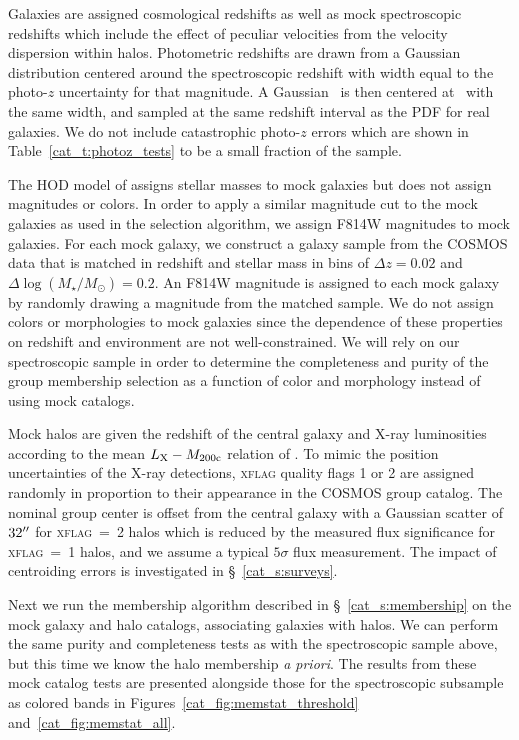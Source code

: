 Galaxies are assigned cosmological redshifts as well as mock
spectroscopic redshifts which include the effect of peculiar
velocities from the velocity dispersion within halos. Photometric
redshifts are drawn from a Gaussian distribution centered around the
spectroscopic redshift with width equal to the photo-$z$ uncertainty for
that magnitude. A Gaussian \pz\ is then centered at \zp\ with the same
width, and sampled at the same redshift interval as the PDF for real
galaxies. We do not include catastrophic photo-$z$ errors which are
shown in Table~\ref{cat_t:photoz_tests} to be a small fraction of the sample. 

The HOD model of \citet{Leauthaud2011a} assigns stellar
masses to mock galaxies but does not assign magnitudes or colors. In
order to apply a similar magnitude cut to the mock galaxies as used in
the selection algorithm, we assign F814W magnitudes to mock
galaxies. For each mock galaxy, we construct a galaxy sample from the
COSMOS data that is matched in redshift and stellar mass in bins of
$\Delta z=0.02$ and $\Delta\log(M_{\star}/M_{\odot})=0.2$. An F814W magnitude
is assigned to each mock galaxy by randomly drawing a magnitude from
the matched sample. We do not assign colors or morphologies to mock
galaxies since the dependence of these properties on redshift and
environment are not well-constrained. We will rely on our
spectroscopic sample in order to determine the completeness and purity
of the group membership selection as a function of color and
morphology instead of using mock catalogs.

Mock halos are given the redshift of the central galaxy and X-ray
luminosities according to the mean $L_{\rm X}-\mbox{$M_{200\rm{c}}$}$ relation of
\citet{Leauthaud2010}. To mimic the position uncertainties of the
X-ray detections, \textsc{xflag} quality flags 1 or 2 are assigned randomly
in proportion to their appearance in the COSMOS group catalog. The nominal
group center is offset from the central galaxy with a Gaussian scatter of $32
\mbox{$^{\prime\prime}$}$ for \textsc{xflag}~=~2 halos which is reduced by the measured flux
significance for \textsc{xflag}~=~1 halos, and we assume a typical
$5\sigma$ flux measurement. The impact of centroiding errors is investigated in
\S~\ref{cat_s:surveys}.

Next we run the membership algorithm described in
\S~\ref{cat_s:membership} on the mock galaxy and halo
catalogs, associating galaxies with halos. We can perform the same
purity and completeness tests as with the spectroscopic sample above,
but this time we know the halo membership \textit{a priori}. The
results from these mock catalog tests are presented alongside those
for the spectroscopic subsample as colored bands in Figures~\ref{cat_fig:memstat_threshold}
and~\ref{cat_fig:memstat_all}.

